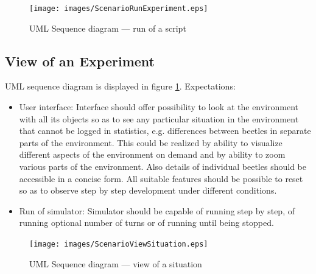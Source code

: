 \documentclass[a4paper,12pt]{report}
\begin{document}
\begin{figure}
\begin{center}
  \texttt{[image: images/ScenarioRunExperiment.eps]} 
  \caption{UML Sequence diagram --- run of a script}
  \label{obr.ScenarioRunExperiment}
\end{center}
\end{figure}

\subsection{View of an Experiment}
UML sequence diagram is displayed in figure \ref{obr.ScenarioRunExperiment}. Expectations:
\begin{itemize}
\item User interface: Interface should offer possibility to look at the environment with all its objects so as to see any particular situation in the environment that cannot be logged in statistics, e.g. differences between beetles in separate parts of the environment. This could be realized by ability to visualize different aspects of the environment on demand and by ability to zoom various parts of the environment. Also details of individual beetles should be accessible in a concise form. All suitable features should be possible to reset so as to observe step by step development under different conditions. 
\item Run of simulator: Simulator should be capable of running step by step, of running optional number of turns or of running until being stopped.
\end{itemize}

\begin{figure}
\begin{center}
  \texttt{[image: images/ScenarioViewSituation.eps]} 
  \caption{UML Sequence diagram --- view of a situation}
  \label{obr.ScenarioViewSituation}
\end{center}
\end{figure}
\end{document}
